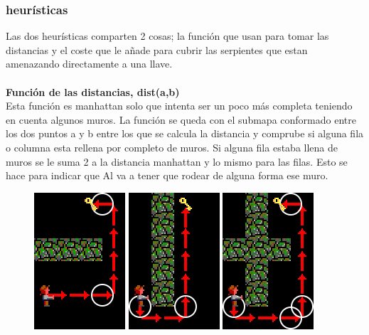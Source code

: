 \documentclass[11pt,spanish]{article}
\begin{document}
		\subsubsection{heurísticas}
		Las dos heurísticas comparten 2 cosas; la función que usan para tomar las distancias y el coste que le añade para cubrir las serpientes que estan amenazando directamente a una llave.\\
			\\
			\textbf{Función de las distancias, dist(a,b)}\\
			Esta función es manhattan solo que intenta ser un poco más completa teniendo en cuenta algunos muros. La función se queda con el submapa conformado entre los dos puntos a y b entre los que se calcula la distancia y comprube si alguna fila o columna esta rellena por completo de muros. Si alguna fila estaba llena de muros se le suma 2 a la distancia manhattan y lo mismo para las filas. Esto se hace para indicar que Al va a tener que rodear de alguna forma ese muro.
			\begin{figure}[h!]
				\centering
				\includegraphics[width=0.2\linewidth]{Horizontal.png}
				\includegraphics[width=0.2\linewidth]{Vertical.png}
				\includegraphics[width=0.2\linewidth]{HorizontalVertical.png}
			\end{figure}
\end{document}
